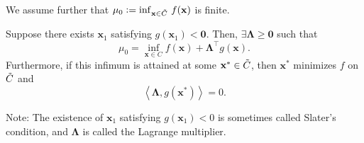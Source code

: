 We assume further that $\mu_0 \vcentcolon= \inf_{\mathbf{x} \in \Tilde{C}} \, f(\mathbf{x})$ is finite. 

\begin{thm}
    Suppose there exists $\mathbf{x}_1$ satisfying $g(\mathbf{x}_1) < \mathbf{0}$. Then, $\exists \bm{\Lambda} \geq \mathbf{0}$ such that
    \[
        \mu_0 = \inf_{\mathbf{x} \in C} f(\mathbf{x}) + \bm{\Lambda}^{\top} g(\mathbf{x}).
    \]
    Furthermore, if this infimum is attained at some $\mathbf{x}^* \in \Tilde{C}$, then $\mathbf{x}^*$ minimizes $f$ on $\Tilde{C}$ and
    \[
        \left\langle \bm{\Lambda}, g(\mathbf{x}^*) \right\rangle = 0.
    \]
\end{thm}

Note: The existence of $\mathbf{x}_1$ satisfying $g(\mathbf{x}_1) < 0$ is sometimes called Slater's condition, and $\bm{\Lambda}$ is called the Lagrange multiplier.

